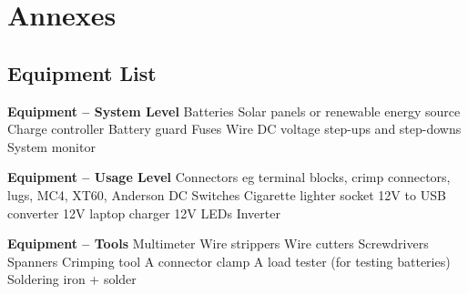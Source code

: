 \documentclass{article}
\theoremstyle{definition}
\theoremstyle{definition}
\theoremstyle{remark}
\begin{document}


{\color{blue}\section{Annexes}} %
\label{sec:annexes}

  {\color{blue}\subsection{Equipment List}} %
  \label{sub:equipment_list}

    \textbf{Equipment – System Level} \newline
    Batteries \newline
    Solar panels or renewable energy source \newline
    Charge controller \newline
    Battery guard \newline
    Fuses \newline
    Wire \newline
    DC voltage step-ups and step-downs \newline
    System monitor

    \textbf{Equipment – Usage Level} \newline
    Connectors eg terminal blocks, crimp \newline
    connectors, lugs, MC4, XT60, Anderson \newline
    DC Switches \newline
    Cigarette lighter socket \newline
    12V to USB converter \newline
    12V laptop charger \newline
    12V LEDs \newline
    Inverter

    \textbf{Equipment – Tools} \newline
    Multimeter \newline
    Wire strippers \newline
    Wire cutters \newline
    Screwdrivers \newline
    Spanners \newline
    Crimping tool \newline
    A connector clamp \newline
    A load tester (for testing batteries) \newline
    Soldering iron + solder
      
\end{document}
